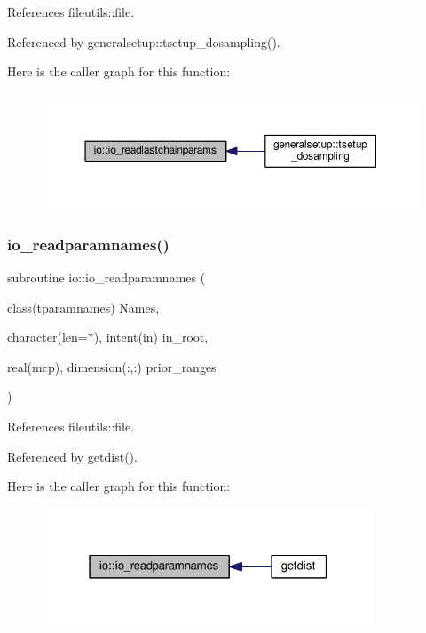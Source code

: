 References fileutils\+::file.



Referenced by generalsetup\+::tsetup\+\_\+dosampling().

Here is the caller graph for this function\+:
\nopagebreak
\begin{figure}[H]
\begin{center}
\leavevmode
\includegraphics[width=350pt]{namespaceio_a9de0b570ee4f35ba8e729e08cd26f7fe_icgraph}
\end{center}
\end{figure}
\mbox{\label{namespaceio_a5bb562a4b599ac448a717abd04d9d856}} 
\subsubsection{\texorpdfstring{io\+\_\+readparamnames()}{io\_readparamnames()}}
{\footnotesize\ttfamily subroutine io\+::io\+\_\+readparamnames (\begin{DoxyParamCaption}\item[{class(tparamnames)}]{Names,  }\item[{character(len=$\ast$), intent(in)}]{in\+\_\+root,  }\item[{real(mcp), dimension(\+:,\+:)}]{prior\+\_\+ranges }\end{DoxyParamCaption})}



References fileutils\+::file.



Referenced by getdist().

Here is the caller graph for this function\+:
\nopagebreak
\begin{figure}[H]
\begin{center}
\leavevmode
\includegraphics[width=280pt]{namespaceio_a5bb562a4b599ac448a717abd04d9d856_icgraph}
\end{center}
\end{figure}
\mbox{\label{namespaceio_a4734dc919ea1333d891f5bc59cedfc66}} 
